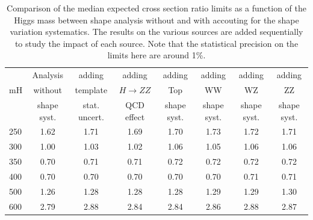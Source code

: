 \begin{table}[!ht]
\begin{center}
{\normalsize
\begin{tabular}{|l|c|cccccc|}
\hline
      &  Analysis    & adding          &  adding      &  adding      &  adding      & adding      & adding \\
mH  &  without     & template        &  $H\to ZZ$   &  Top         &  WW          & WZ          & ZZ \\
      &  shape syst. & stat. uncert.   &  QCD effect &  shape syst. &  shape syst. & shape syst. & shape syst. \\
\hline
250 & 1.62 & 1.71 & 1.69 & 1.70 & 1.73 & 1.72 & 1.71 \\   
300 & 1.00 & 1.03 & 1.02 & 1.06 & 1.05 & 1.06 & 1.06 \\ 
350 & 0.70 & 0.71 & 0.71 & 0.72 & 0.72 & 0.72 & 0.72 \\
400 & 0.70 & 0.70 & 0.70 & 0.70 & 0.70 & 0.71 & 0.71 \\
500 & 1.26 & 1.28 & 1.28 & 1.28 & 1.29 & 1.29 & 1.30 \\
600 & 2.79 & 2.88 & 2.84 & 2.84 & 2.86 & 2.88 & 2.87 \\
\hline
\end{tabular}
}
\caption{Comparison of the median expected cross section ratio limits as a function 
of the Higgs mass between shape analysis without and with accouting for the 
shape variation systematics. The results on the various sources are added sequentially 
to study the impact of each source. Note that the statistical precision on the limits 
here are around 1\%. }
\label{tab:mva_mtshape_detail}
\end{center}
\end{table}

